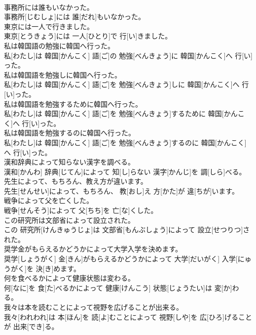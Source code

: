 \documentclass[8pt]{extreport}
\begin{document}
\begin{CJK}{UTF8}{min}
\\	事務所には誰もいなかった。	
\\	事務所[じむしょ]には 誰[だれ]もいなかった。
\\	東京には一人で行きました。	
\\	東京[とうきょう]には 一人[ひとり]で 行[い]きました。
\\	私は韓国語の勉強に韓国へ行った。	
\\	私[わたし]は 韓国[かんこく] 語[ご]の 勉強[べんきょう]に 韓国[かんこく]へ 行[い]った。
\\	私は韓国語を勉強しに韓国へ行った。	
\\	私[わたし]は 韓国[かんこく] 語[ご]を 勉強[べんきょう]しに 韓国[かんこく]へ 行[い]った。
\\	私は韓国語を勉強するために韓国へ行った。	
\\	私[わたし]は 韓国[かんこく] 語[ご]を 勉強[べんきょう]するために 韓国[かんこく]へ 行[い]った。
\\	私は韓国語を勉強するのに韓国へ行った。	
\\	私[わたし]は 韓国[かんこく] 語[ご]を 勉強[べんきょう]するのに 韓国[かんこく]へ 行[い]った。
\\	漢和辞典によって知らない漢字を調べる。	
\\	漢和[かんわ] 辞典[じてん]によって 知[し]らない 漢字[かんじ]を 調[しら]べる。
\\	先生によって、もちろん、教え方が違います。	
\\	先生[せんせい]によって、もちろん、 教[おし]え 方[かた]が 違[ちが]います。
\\	戦争によって父を亡くした。	
\\	戦争[せんそう]によって 父[ちち]を 亡[な]くした。
\\	この研究所は文部省によって設立された。	
\\	この 研究所[けんきゅうじょ]は 文部省[もんぶしょう]によって 設立[せつりつ]された。
\\	奨学金がもらえるかどうかによって大学入学を決めます。	
\\	奨学[しょうがく] 金[きん]がもらえるかどうかによって 大学[だいがく] 入学[にゅうがく]を 決[き]めます。
\\	何を食べるかによって健康状態は変わる。	
\\	何[なに]を 食[た]べるかによって 健康[けんこう] 状態[じょうたい]は 変[か]わる。
\\	我々は本を読むことによって視野を広げることが出来る。	
\\	我々[われわれ]は 本[ほん]を 読[よ]むことによって 視野[しや]を 広[ひろ]げることが 出来[でき]る。

\end{CJK}
\end{document}
